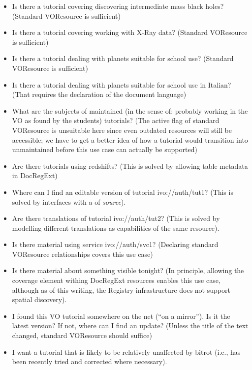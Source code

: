 \documentclass{ivoa}
\begin{document}
\begin{itemize}

\item Is there a tutorial covering discovering intermediate mass black
holes? (Standard VOResource is sufficient){}

\item Is there a tutorial covering working with X-Ray data? (Standard
VOResource is sufficient){}

\item Is there a tutorial dealing with planets suitable for school use?
(Standard VOResource is sufficient){}

\item Is there a tutorial dealing with planets suitable for school use in
Italian? (That requires the declaration of the document language){}

\item What are the subjects of maintained (in the sense of: probably
working in the VO as found by the students) tutorials?
(The active flag of standard VOResource is
unsuitable here since even outdated resources will still be accessible;
we have to get a better idea of how a tutorial would transition into
unmaintained before this use case can actually be supported)

\item Are there tutorials using redshifts? (This is solved by allowing
table metadata in DocRegExt){}

\item Where can I find an editable version of tutorial ivo://auth/tut1?
(This is solved by interfaces with a  of \textit{source}).

\item Are there translations of tutorial ivo://auth/tut2? (This is
solved by modelling different translations as capabilities of the same
resource).

\item Is there material using service ivo://auth/svc1? (Declaring
standard VOResource relationships covers this use case)

\item Is there material about something visible tonight? (In principle,
allowing the coverage element withing DocRegExt resources enables this
use case, although as of this writing, the Registry infrastructure does
not support spatial discovery).

\item I found this VO tutorial somewhere on the net (``on a mirror'').  Is it
the latest version?  If not, where can I find an update? (Unless the
title of the text changed, standard VOResource should suffice){}

\item I want a tutorial that is likely to be relatively unaffected by
bitrot (i.e., has been recently tried and corrected where necessary).

\end{itemize}
\end{document}
